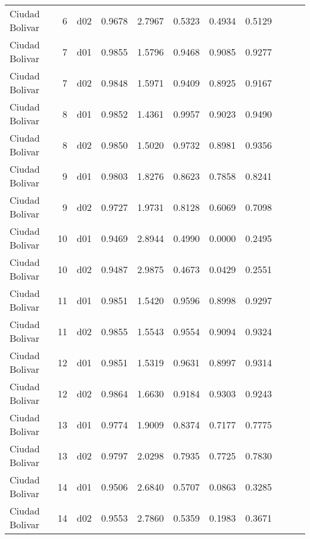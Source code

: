 \begin{landscape}
\begin{longtable}{p{2cm}rrrrrrrrrr}
       Ciudad Bolivar  &          6 &     d02 &   0.9678 &  2.7967 &        0.5323 &           0.4934 &  0.5129 \\
       Ciudad Bolivar  &          7 &     d01 &   0.9855 &  1.5796 &        0.9468 &           0.9085 &  0.9277 \\
       Ciudad Bolivar  &          7 &     d02 &   0.9848 &  1.5971 &        0.9409 &           0.8925 &  0.9167 \\
       Ciudad Bolivar  &          8 &     d01 &   0.9852 &  1.4361 &        0.9957 &           0.9023 &  0.9490 \\
       Ciudad Bolivar  &          8 &     d02 &   0.9850 &  1.5020 &        0.9732 &           0.8981 &  0.9356 \\
       Ciudad Bolivar  &          9 &     d01 &   0.9803 &  1.8276 &        0.8623 &           0.7858 &  0.8241 \\
       Ciudad Bolivar  &          9 &     d02 &   0.9727 &  1.9731 &        0.8128 &           0.6069 &  0.7098 \\
       Ciudad Bolivar  &         10 &     d01 &   0.9469 &  2.8944 &        0.4990 &           0.0000 &  0.2495 \\
       Ciudad Bolivar  &         10 &     d02 &   0.9487 &  2.9875 &        0.4673 &           0.0429 &  0.2551 \\
       Ciudad Bolivar  &         11 &     d01 &   0.9851 &  1.5420 &        0.9596 &           0.8998 &  0.9297 \\
       Ciudad Bolivar  &         11 &     d02 &   0.9855 &  1.5543 &        0.9554 &           0.9094 &  0.9324 \\
       Ciudad Bolivar  &         12 &     d01 &   0.9851 &  1.5319 &        0.9631 &           0.8997 &  0.9314 \\
       Ciudad Bolivar  &         12 &     d02 &   0.9864 &  1.6630 &        0.9184 &           0.9303 &  0.9243 \\
       Ciudad Bolivar  &         13 &     d01 &   0.9774 &  1.9009 &        0.8374 &           0.7177 &  0.7775 \\
       Ciudad Bolivar  &         13 &     d02 &   0.9797 &  2.0298 &        0.7935 &           0.7725 &  0.7830 \\
       Ciudad Bolivar  &         14 &     d01 &   0.9506 &  2.6840 &        0.5707 &           0.0863 &  0.3285 \\
       Ciudad Bolivar  &         14 &     d02 &   0.9553 &  2.7860 &        0.5359 &           0.1983 &  0.3671 \\

\end{longtable}
\end{landscape}
